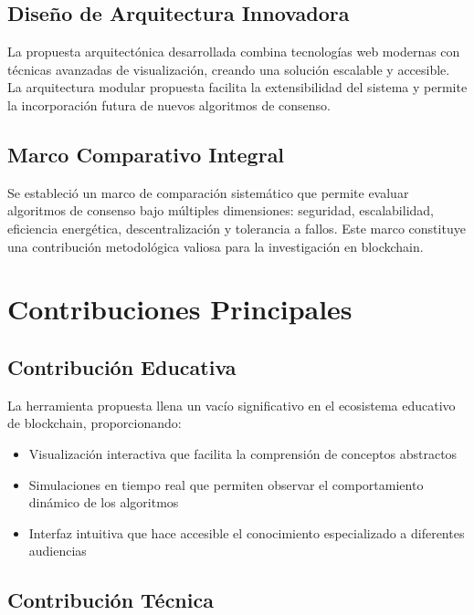 \documentclass[spanish,12pt,letterpaper]{report}
\begin{document}
\subsection{Diseño de Arquitectura Innovadora}

La propuesta arquitectónica desarrollada combina tecnologías web modernas con técnicas avanzadas de visualización, creando una solución escalable y accesible. La arquitectura modular propuesta facilita la extensibilidad del sistema y permite la incorporación futura de nuevos algoritmos de consenso.

\subsection{Marco Comparativo Integral}

Se estableció un marco de comparación sistemático que permite evaluar algoritmos de consenso bajo múltiples dimensiones: seguridad, escalabilidad, eficiencia energética, descentralización y tolerancia a fallos. Este marco constituye una contribución metodológica valiosa para la investigación en blockchain.

\section{Contribuciones Principales}

\subsection{Contribución Educativa}

La herramienta propuesta llena un vacío significativo en el ecosistema educativo de blockchain, proporcionando:

\begin{itemize}
    \item Visualización interactiva que facilita la comprensión de conceptos abstractos
    \item Simulaciones en tiempo real que permiten observar el comportamiento dinámico de los algoritmos
    \item Interfaz intuitiva que hace accesible el conocimiento especializado a diferentes audiencias
\end{itemize}

\subsection{Contribución Técnica}
\end{document}
